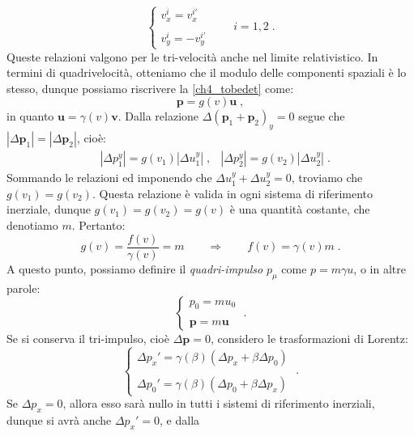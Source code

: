\begin{equation}
 \begin{cases}
  v_x^i=v_x^{i'} \\
\\
v_y^i=-v_y^{i'}
 \end{cases}\qquad i=1,2\;.
\end{equation}
Queste relazioni valgono per le tri-velocità anche nel limite relativistico. In termini di quadrivelocità, otteniamo che il modulo delle 
componenti spaziali è lo stesso, dunque possiamo riscrivere la \eqref{ch4_tobedet} come:
\begin{equation}
\mathbf{p}=g(v)\mathbf{u}\;,
\end{equation}
in quanto $\mathbf{u}=\gamma(v)\mathbf{v}$. Dalla relazione $\Delta(\mathbf{p}_1+\mathbf{p}_2)_y=0$ segue che $|\Delta \mathbf{p}_1|=|\Delta\mathbf{p}_2|$, cioè:
\begin{align}
&|\Delta p_1^y|=g(v_1)|\Delta u_1^y|\;, &|\Delta p_2^y|=g(v_2)|\Delta u_2^y|\;.
\end{align}
Sommando le relazioni ed imponendo che $\Delta u_1^y+\Delta u_2^y=0$, troviamo che $g(v_1)=g(v_2)$. Questa relazione è valida in ogni 
sistema di riferimento inerziale, dunque $g(v_1)=g(v_2)=g(v)$ è una quantità costante, che denotiamo $m$. Pertanto:
\begin{equation}
g(v)=\frac{f(v)}{\gamma(v)}=m\qquad \Longrightarrow\qquad f(v)=\gamma(v)m\;.
\end{equation}
A questo punto, possiamo definire il \textit{quadri-impulso} $p_{\mu}$ come $p=m\gamma u$, o in altre parole:
\begin{equation}
 \begin{cases}
  p_0=mu_0 \\
\\
\mathbf{p}=m\mathbf{u}
 \end{cases}\;.
\end{equation}
Se si conserva il tri-impulso, cioè $\Delta\mathbf{p}=0$, considero le trasformazioni di Lorentz:
\begin{equation}
\begin{cases}
\Delta p_x'=\gamma(\beta)(\Delta p_x+\beta\Delta p_0) \\
\\
\Delta p_0'=\gamma(\beta)(\Delta p_0+\beta\Delta p_x)
\end{cases}\;.
\end{equation}
Se $\Delta p_x=0$, allora esso sarà nullo in tutti i sistemi di riferimento inerziali, dunque si avrà anche $\Delta p_x'=0$, e dalla 
